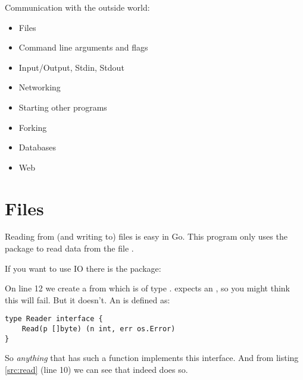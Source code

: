 Communication with the outside world:
\begin{itemize}
\item{Files}
\item{Command line arguments and flags}
\item{Input/Output, Stdin, Stdout}
\item{Networking}
\item{Starting other programs}
\item{Forking}
\item{Databases}
\item{Web}
\end{itemize}

\section{Files}
Reading from (and writing to) files is easy in Go. This program
only uses the  package to read data from the file .

If you want to use  IO there is the
 package:


On line 12 we create a  from  which is of
type .  expects an , so you
might think this will fail. But it doesn't. An  is
defined as:
\begin{lstlisting}
type Reader interface {
    Read(p []byte) (n int, err os.Error)
}
\end{lstlisting}
So \emph{anything} that has such a  function implements this
interface. And from listing \ref{src:read} (line 10) we can see
that  indeed does so. 

